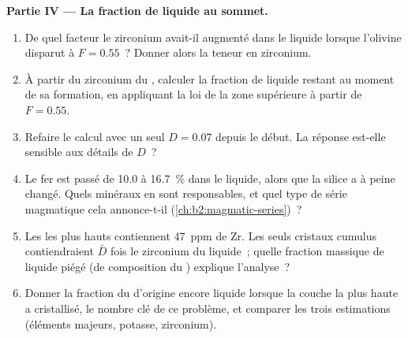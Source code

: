 \begin{problem}
\noindent\textbf{Partie IV --- La fraction de liquide au sommet.}
\begin{enumerate}[resume]
\item De quel facteur le zirconium avait-il augmenté dans le liquide lorsque l'olivine disparut à
$F = 0.55$~? Donner alors la teneur en zirconium.
\item À partir du zirconium du , calculer la fraction de liquide restant au moment de sa
formation, en appliquant la loi de la zone supérieure à partir de $F = 0.55$.
\item Refaire le calcul avec un seul $D = 0.07$ depuis le début. La réponse est-elle
sensible aux détails de $D$~?
\item Le fer est passé de 10.0 à \qty{16.7}{\percent} dans le liquide, alors que la silice a à peine
changé. Quels minéraux en sont responsables, et quel type de série magmatique
cela annonce-t-il (\cref{ch:b2:magmatic-series})~?
\item Les  les plus hauts contiennent \qty{47}{ppm} de Zr. Les seuls cristaux cumulus contiendraient
$\bar D$ fois le zirconium du liquide~; quelle fraction massique de liquide piégé
(de composition du ) explique l'analyse~?
\item Donner la fraction du  d'origine encore liquide lorsque la couche la plus haute
a cristallisé, le nombre clé de ce problème, et comparer les trois estimations
(éléments majeurs, potasse, zirconium).
\end{enumerate}
\end{problem}
